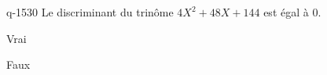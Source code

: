 \begin{truefalse}{q-1530}
Le discriminant du trinôme $4X^2+48X+144$ est égal à $0$.
\item* Vrai
\item Faux
\end{truefalse}

